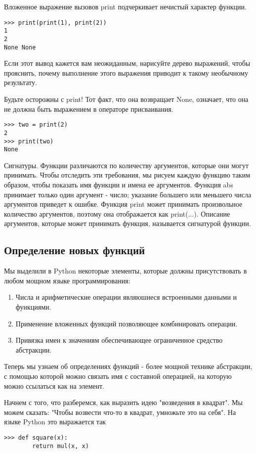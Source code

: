 Вложенное выражение вызовов print подчеркивает нечистый характер функции.
\begin{verbatim}
>>> print(print(1), print(2))
1
2
None None
\end{verbatim}

Если этот вывод кажется вам неожиданным, нарисуйте дерево выражений, чтобы прояснить, почему выполнение этого выражения приводит к такому необычному результату.

Будьте осторожны с print! Тот факт, что она возвращает None, означает, что она не должна быть выражением в операторе присваивания.
\begin{verbatim}
>>> two = print(2)
2
>>> print(two)
None
\end{verbatim}

Сигнатуры. Функции различаются по количеству аргументов, которые они могут принимать. Чтобы отследить эти требования, мы рисуем каждую функцию таким образом, чтобы показать имя функции и имена ее аргументов. Функция abs принимает только один аргумент - число; указание большего или меньшего числа аргументов приведет к ошибке. Функция print может принимать произвольное количество аргументов, поэтому она отображается как print(...). Описание аргументов, которые может принимать функция, называется сигнатурой функции.

\subsection{Определение новых функций}
Мы выделили в Python некоторые элементы, которые должны присутствовать в любом мощном языке программирования:
\begin{enumerate}
  \item Числа и арифметические операции являюшиеся встроенными данными и функциями.
  \item Применение вложенных функций позволяющее комбинировать операции.
  \item Привязка имен к значениям обеспечивающее ограниченное средство абстракции.
\end{enumerate}
Теперь мы узнаем об определениях функций - более мощной технике абстракции, с помощью которой можно связать имя с составной операцией, на которую можно ссылаться как на элемент.

Начнем с того, что разберемся, как выразить идею "возведения в квадрат". Мы можем сказать: "Чтобы возвести что-то в квадрат, умножьте это на себя". На языке Python это выражается так
\begin{verbatim}
>>> def square(x):
        return mul(x, x)
\end{verbatim}


